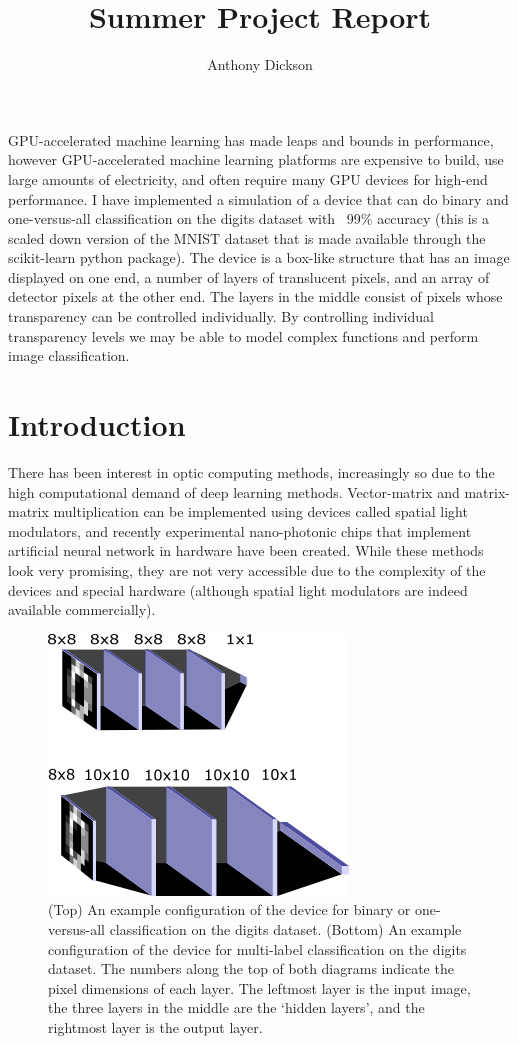 \documentclass[]{article}
\title{Summer Project Report}
\author{Anthony Dickson}
\begin{document}
\maketitle

GPU-accelerated machine learning has made leaps and bounds in performance, however GPU-accelerated machine learning platforms are expensive to build, use large amounts of electricity, and often require many GPU devices for high-end performance. I have implemented a simulation of a device that can do binary and one-versus-all classification on the digits dataset with ~99\% accuracy (this is a scaled down version of the MNIST dataset that is made available through the scikit-learn python package). The device is a box-like structure that has an image displayed on one end, a number of layers of translucent pixels, and an array of detector pixels at the other end. The layers in the middle consist of pixels whose transparency can be controlled individually. By controlling individual transparency levels we may be able to model complex functions and perform image classification.

\section{Introduction}
There has been interest in optic computing methods, increasingly so due to the high computational demand of deep learning methods. Vector-matrix and matrix-matrix multiplication can be implemented using devices called spatial light modulators, and recently experimental nano-photonic chips that implement artificial neural network in hardware have been created. While these methods look very promising, they are not very accessible due to the complexity of the devices and special hardware (although spatial light modulators are indeed available commercially).

\begin{figure}
	\centering
	\includegraphics{../images/device_3d_view}
	\caption{(Top) An example configuration of the device for binary or one-versus-all classification on the digits dataset. (Bottom) An example configuration of the device for multi-label classification on the digits dataset. 
		The numbers along the top of both diagrams indicate the pixel dimensions of each layer. The leftmost layer is the input image, the three layers in the middle are the ‘hidden layers’, and the rightmost layer is the output layer. 
	}
\end{figure}
\end{document}
